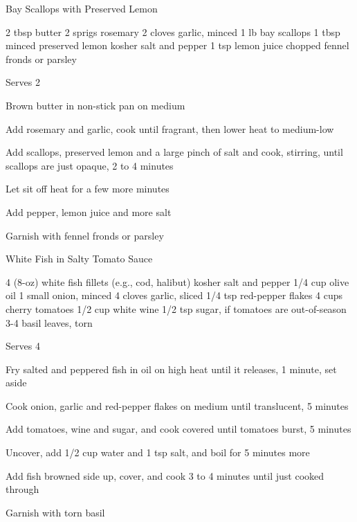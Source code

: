 \begin{recipe}{Bay Scallops with Preserved Lemon}{}
\begin{ingredients}
2 tbsp butter
2 sprigs rosemary
2 cloves garlic, minced
1 lb bay scallops
1 tbsp minced preserved lemon
kosher salt and pepper
1 tsp lemon juice
chopped fennel fronds or parsley
\end{ingredients}
\nextcolumn
Serves 2
\begin{steps}
    \item Brown butter in non-stick pan on medium
    \item Add rosemary and garlic, cook until fragrant, then lower heat to medium-low
    \item Add scallops, preserved lemon and a large pinch of salt and cook, stirring, until scallops are just opaque, 2 to 4 minutes
    \item Let sit off heat for a few more minutes
    \item Add pepper, lemon juice and more salt
    \item Garnish with fennel fronds or parsley
\end{steps}
\end{recipe}

\begin{denserecipe}{White Fish in Salty Tomato Sauce}{}
\begin{ingredients}
4 (8-oz) white fish fillets (e.g., cod, halibut)
kosher salt and pepper
1/4 cup olive oil
1 small onion, minced
4 cloves garlic, sliced
1/4 tsp red-pepper flakes
4 cups cherry tomatoes
1/2 cup white wine
1/2 tsp sugar, if tomatoes are out-of-season
3-4 basil leaves, torn
\end{ingredients}
\nextcolumn
Serves 4
\begin{steps}
\item Fry salted and peppered fish in oil on high heat until it releases, 1 minute, set aside
\item Cook onion, garlic and red-pepper flakes on medium until translucent, 5 minutes
\item Add tomatoes, wine and sugar, and cook covered until tomatoes burst, 5 minutes
\item Uncover, add 1/2 cup water and 1 tsp salt, and boil for 5 minutes more
\item Add fish browned side up, cover, and cook 3 to 4 minutes until just cooked through
\item Garnish with torn basil
\end{steps}
\end{denserecipe}


